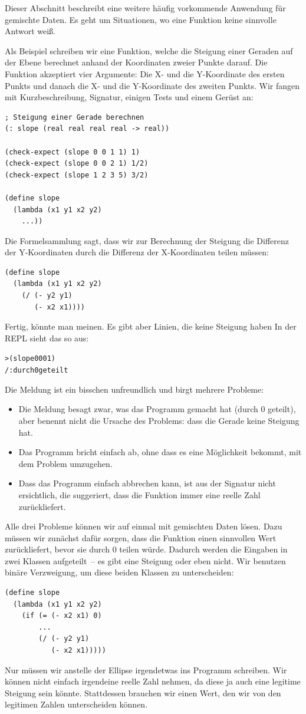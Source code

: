 %
Dieser Abschnitt beschreibt eine weitere häufig vorkommende Anwendung
für gemischte Daten.  Es geht um Situationen, wo eine Funktion
keine sinnvolle Antwort weiß.

Als Beispiel schreiben wir eine Funktion, welche die Steigung einer
Geraden auf der Ebene berechnet anhand der Koordinaten zweier Punkte
darauf.  Die Funktion akzeptiert vier Argumente: Die X- und die Y-Koordinate des
ersten Punkts und danach die X- und die Y-Koordinate des zweiten
Punkts.  Wir fangen mit Kurzbeschreibung, Signatur, einigen Tests
und einem Gerüst an:
%
\begin{lstlisting}
; Steigung einer Gerade berechnen
(: slope (real real real real -> real))

(check-expect (slope 0 0 1 1) 1)
(check-expect (slope 0 0 2 1) 1/2)
(check-expect (slope 1 2 3 5) 3/2)

(define slope
  (lambda (x1 y1 x2 y2)
    ...))
\end{lstlisting}
%
Die Formelsammlung sagt, dass wir zur Berechnung der Steigung die
Differenz der Y-Koordinaten durch die Differenz der X-Koordinaten
teilen müssen:
%
\begin{lstlisting}
(define slope
  (lambda (x1 y1 x2 y2)
    (/ (- y2 y1)
       (- x2 x1))))
\end{lstlisting}
%
Fertig, könnte man meinen.  Es gibt aber Linien, die keine Steigung
haben  In der REPL sieht das so aus:
%
\begin{alltt}
> (slope 0 0 0 1)
{\color{red}/: durch 0 geteilt}
\end{alltt}
%
Die Meldung ist ein bisschen unfreundlich und birgt mehrere Probleme:
%
\begin{itemize}
\item Die Meldung besagt zwar, was das Programm gemacht hat (durch $0$
  geteilt), aber benennt nicht die Ursache des Problems: dass die
  Gerade keine Steigung hat.
\item Das Programm bricht einfach ab, ohne dass es eine Möglichkeit
  bekommt, mit dem Problem umzugehen.
\item Dass das Programm einfach abbrechen kann, ist aus der Signatur
  nicht ersichtlich, die suggeriert, dass die Funktion immer eine
  reelle Zahl zurückliefert.
\end{itemize}
%
Alle drei Probleme können wir auf einmal mit gemischten Daten lösen.
Dazu müssen wir zunächst dafür sorgen, dass die Funktion einen
sinnvollen Wert zurückliefert, bevor sie durch $0$ teilen würde.
Dadurch werden die Eingaben in zwei Klassen aufgeteilt~-- es gibt eine
Steigung oder eben nicht.  Wir benutzen binäre Verzweigung,
um diese beiden Klassen zu unterscheiden:
%
\begin{lstlisting}
(define slope
  (lambda (x1 y1 x2 y2)
    (if (= (- x2 x1) 0)
        ...
        (/ (- y2 y1)
           (- x2 x1))))) 
\end{lstlisting}
%
Nur müssen wir anstelle der Ellipse irgendetwas ins Programm
schreiben.  Wir können nicht einfach irgendeine reelle Zahl nehmen, da
diese ja auch eine legitime Steigung sein könnte.  Stattdessen
brauchen wir einen Wert, den wir von den legitimen Zahlen
unterscheiden können.


